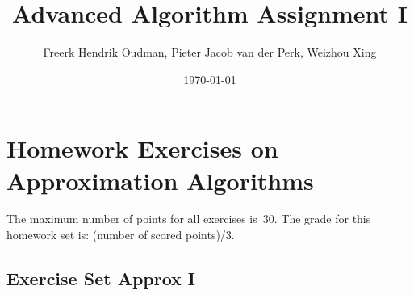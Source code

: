 \documentclass{article}
\title{Advanced Algorithm Assignment I}
\author{Freerk Hendrik Oudman, Pieter Jacob van der Perk, Weizhou Xing}
\date{\today}
\begin{document}
    \maketitle
    \section*{Homework Exercises on Approximation Algorithms}
    The maximum number of points for all exercises is~30.
    The grade for this homework set is: (number of scored points)/3.
    
    \newcommand{\setnr}{A.I}
    \subsection*{Exercise Set Approx I}
\end{document}
